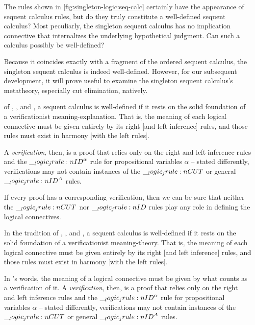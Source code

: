 The rules shown in \cref{fig:singleton-logic:seq-calc} certainly have the appearance of sequent calculus rules, but do they truly constitute a well-defined sequent calculus?
Most peculiarly, the singleton sequent calculus has no implication connective that internalizes the underlying hypothetical judgment.
Can such a calculus possibly be well-defined?

Because it coincides exactly with a fragment of the ordered sequent calculus, the singleton sequent calculus is indeed well-defined.
However, for our subsequent development, it will prove useful to examine the singleton sequent calculus's metatheory, especially cut elimination, natively.

 of \citeauthor{Gentzen:MZ35}, \citeauthor{Dummett:WJ76}, and \citeauthor{Martin-Lof:Siena83}\autocites{Gentzen:MZ35}{Dummett:WJ76}{Martin-Lof:Siena83}, a sequent calculus is well-defined if it rests on the solid foundation of a verificationist meaning-explanation.
That is, the meaning of each logical connective must be given entirely by its right [and left inference] rules, and those rules must exist in harmony [with the left rules].%

A \emph{verification}, then, is a proof that relies only on the right and left inference rules and the $\__logic_jrule:n {ID}^{\alpha}$ rule for propositional variables $\alpha$ -- stated differently, verifications may not contain instances of the $\__logic_jrule:n {CUT}$ or general $\__logic_jrule:n {ID}^A$ rules.

If every proof has a corresponding verification, then we can be sure that neither the $\__logic_jrule:n {CUT}$ nor $\__logic_jrule:n {ID}$ rules play any role in defining the logical connectives.


In the tradition of \citeauthor{Gentzen:??}, \citeauthor{Dummett:??}, and \citeauthor{Martin-Lof:??}\autocites{Gentzen:??}{Dummett:??}{Martin-Lof:??}, a sequent calculus is well-defined if it rests on the solid foundation of a verificationist meaning-theory.
That is, the meaning of each logical connective must be given entirely by its right [and left inference] rules, and those rules must exist in harmony [with the left rules].%

In \citeauthor{Martin-Lof:??}'s words, the meaning of a logical connective must be given by what counts as a verification of it.
A \emph{verification}, then, is a proof that relies only on the right and left inference rules and the $\__logic_jrule:n {ID}^{\alpha}$ rule for propositional variables $\alpha$ -- stated differently, verifications may not contain instances of the $\__logic_jrule:n {CUT}$ or general $\__logic_jrule:n {ID}^A$ rules.


